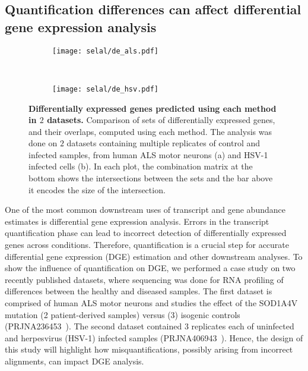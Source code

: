 \subsection{Quantification differences can affect differential gene expression analysis}
\label{sec:DE}
\begin{figure}[ht!]
    \centering
    \begin{subfigure}[t]{0.49\textwidth}
        \centering
  	  	\texttt{[image: selal/de\_als.pdf]}
		\caption{}
    \end{subfigure}
    ~ 
    \begin{subfigure}[t]{0.49\textwidth}
        \centering
  	  	\texttt{[image: selal/de\_hsv.pdf]}
		\caption{}
    \end{subfigure}
    \caption{\textbf{Differentially expressed genes predicted using each method in $2$ datasets.} 
    Comparison of sets of differentially expressed genes, and their overlaps, computed using each method.
    The analysis was done on $2$ datasets containing multiple replicates of control and infected samples, from human ALS
    motor neurons (a) and HSV-1 infected cells (b). In each plot, the combination matrix at the bottom shows the intersections between the sets and the bar above
      it encodes the size of the intersection. }
    \label{fig:dge}
\end{figure}

One of the most common downstream uses of transcript and gene abundance estimates is
differential gene expression analysis. Errors in the
transcript quantification phase can lead to incorrect detection of
differentially expressed genes across conditions. Therefore, quantification
is a crucial step for accurate differential gene expression (DGE) estimation and
other downstream analyses. To show the influence of quantification on DGE, we
performed a case study on two recently published datasets, where sequencing was
done for RNA profiling of differences between the healthy and diseased samples. 
The first dataset is comprised of human ALS motor neurons and studies the effect 
of the SOD1A4V mutation (2 patient-derived samples) versus (3) isogenic controls (PRJNA236453~\cite{kiskinis2014pathways}). The
second dataset contained $3$ replicates each of uninfected and herpesvirus (HSV-1) infected 
samples (PRJNA406943~\cite{shi2018deep}). Hence, the design of this study will highlight how
misquantifications, possibly arising from incorrect alignments, can impact DGE analysis.



